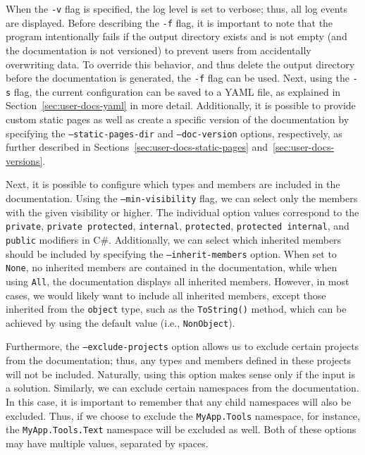 When the \texttt{-v} flag is specified, the log level is set to verbose; thus, all log events are displayed.
Before describing the \texttt{-f} flag, it is important to note that the program intentionally fails
if the output directory exists and is not empty (and the documentation is not versioned) to prevent users from accidentally overwriting data.
To override this behavior, and thus delete the output directory before the documentation is generated, the \texttt{-f} flag can be used.
Next, using the \texttt{-s} flag, the current configuration can be saved to a YAML file, as explained in Section~\ref{sec:user-docs-yaml} in more detail.
Additionally, it is possible to provide custom static pages as well as create a specific version of the documentation 
by specifying the \texttt{--static-pages-dir} and \texttt{--doc-version} options, respectively, as further described in Sections~\ref{sec:user-docs-static-pages} and~\ref{sec:user-docs-versions}.

Next, it is possible to configure which types and members are included in the documentation.
Using the \texttt{--min-visibility} flag, we can select only the members with the given visibility or higher.
The individual option values correspond to the \texttt{private}, \texttt{private protected}, \texttt{internal}, \texttt{protected}, \texttt{protected \linebreak internal}, and \texttt{public} modifiers in C\#.
Additionally, we can select which inherited members should be included by specifying the \texttt{--inherit-members} option.
When set to \texttt{None}, no inherited members are contained in the documentation, while when using \texttt{All}, the documentation displays all inherited members.
However, in most cases, we would likely want to include all inherited members, except those inherited from the \texttt{object} type, 
such as the \texttt{ToString()} method, which can be achieved by using the default value (i.e.,  \texttt{NonObject}).

Furthermore, the \texttt{--exclude-projects} option allows us to exclude certain projects from the documentation; thus, any types and members defined in these projects will not be included.
Naturally, using this option makes sense only if the input is a solution.
Similarly, we can exclude certain namespaces from the documentation.
In this case, it is important to remember that any child namespaces will also be excluded.
Thus, if we choose to exclude the \texttt{MyApp.Tools} namespace, for instance, the \texttt{MyApp.Tools.Text} namespace will be excluded as well.
Both of these options may have multiple values, separated by spaces.

